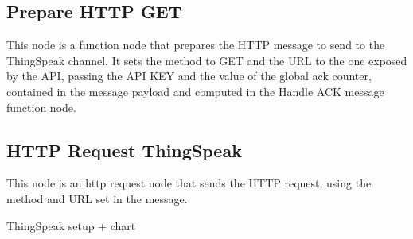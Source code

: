 \subsection{Prepare HTTP GET}
This node is a function node that prepares the HTTP message to send to the ThingSpeak channel. It sets the method to GET and the URL to the one exposed by the API, passing the API KEY and the value of the global ack counter, contained in the message payload and computed in the Handle ACK message function node.

\subsection{HTTP Request ThingSpeak}
This node is an http request node that sends the HTTP request, using the method and URL set in the message.

ThingSpeak setup + chart



